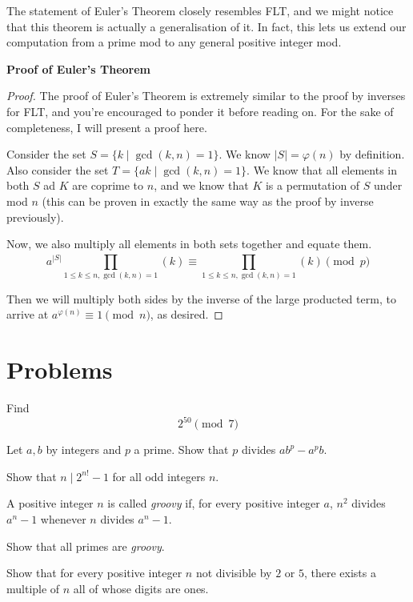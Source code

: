 \documentclass{article}
\theoremstyle{mytheoremstyle}
\theoremstyle{mytheoremstyle}
\theoremstyle{myproblemstyle}
\begin{document}
    The statement of Euler's Theorem closely resembles FLT, and we might notice that this theorem is actually a generalisation of it. In fact, this lets us extend our computation from a prime mod to any general positive integer mod.

    \textbf{Proof of Euler's Theorem}

    \begin{proof}
        The proof of Euler's Theorem is extremely similar to the proof by inverses for FLT, and you're encouraged to ponder it before reading on. For the sake of completeness, I will present a proof here.
        
        Consider the set $S = \{k \mid \gcd(k, n) = 1\}$. We know $|S| = \varphi(n)$ by definition. Also consider the set $T = \{ak \mid \gcd(k, n) = 1\}$. We know that all elements in both $S$ ad $K$ are coprime to $n$, and we know that $K$ is a permutation of $S$ under mod $n$ (this can be proven in exactly the same way as the proof by inverse previously).

        Now, we also multiply all elements in both sets together and equate them. 
        \[a^{|S|} \prod_{1 \leq k \leq n, \gcd(k, n) = 1}^{}(k) \equiv \prod_{1 \leq k \leq n, \gcd(k, n) = 1}^{}(k) \pmod{p} \]

        Then  we will multiply both sides by the inverse of the large producted term, to arrive at $a^{\varphi(n)} \equiv 1 \pmod{n}$, as desired.
    \end{proof}

    \section{Problems}
    \begin{problem}
        Find
        \[2^{50} \pmod{7}\]
    \end{problem}
    
    \begin{problem}
        Let $a, b$ by integers and $p$ a prime. Show that $p$ divides $ab^p - a^pb$.
    \end{problem}

    \begin{problem}
        Show that $n \mid 2^{n!} - 1$ for all odd integers $n$.
    \end{problem}

    \begin{problem}
        A positive integer $n$ is called \textit{groovy} if, for every positive integer $a$, $n^2$ divides $a^n - 1$ whenever $n$ divides $a^n - 1$.

        Show that all primes are \textit{groovy}.
    \end{problem}

    \begin{problem}
        Show that for every positive integer $n$ not divisible by $2$ or $5$, there exists a multiple of $n$ all of whose digits are ones.
    \end{problem}

    
    
\end{document}
